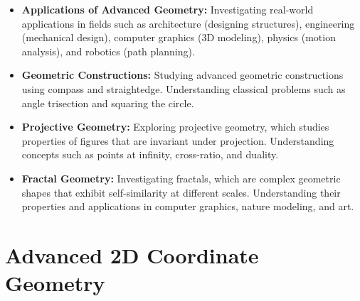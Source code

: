 \documentclass[openany]{book}
\begin{document}
\begin{itemize}
    \item \textbf{Applications of Advanced Geometry:} Investigating real-world applications in fields such as architecture (designing structures), engineering (mechanical design), computer graphics (3D modeling), physics (motion analysis), and robotics (path planning).
    \item \textbf{Geometric Constructions:} Studying advanced geometric constructions using compass and straightedge. Understanding classical problems such as angle trisection and squaring the circle.
    \item \textbf{Projective Geometry:} Exploring projective geometry, which studies properties of figures that are invariant under projection. Understanding concepts such as points at infinity, cross-ratio, and duality.
    \item \textbf{Fractal Geometry:} Investigating fractals, which are complex geometric shapes that exhibit self-similarity at different scales. Understanding their properties and applications in computer graphics, nature modeling, and art.
\end{itemize}
\section{Advanced 2D Coordinate Geometry}
\end{document}
